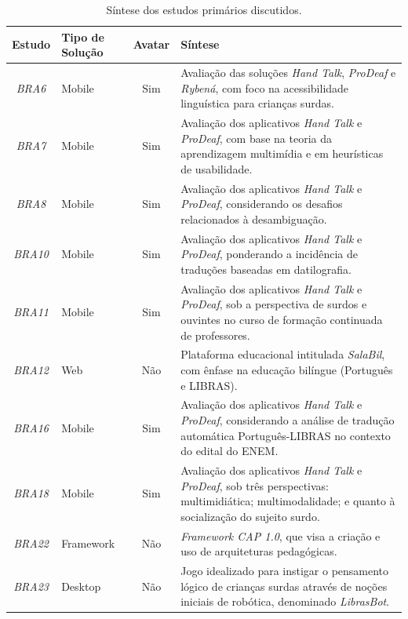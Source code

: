 \begin{small}
\setlength\tabcolsep{0.1cm}
\begin{longtable}{c|>{\centering\arraybackslash}p{2.75cm}|c|p{10cm}}
\caption{Síntese dos estudos primários discutidos.}
\label{ms:table:sintese-estudos}
\endfirsthead
\endhead
\hline
\textbf{Estudo} & \textbf{Tipo de Solução} & \textbf{Avatar} & \textbf{Síntese} \\ \hline
\textit{BRA6} & Mobile & Sim & Avaliação das soluções \textit{Hand Talk}, \textit{ProDeaf} e \textit{Rybená}, com foco na acessibilidade linguística para crianças surdas. \\ \hline
\textit{BRA7} & Mobile & Sim & Avaliação dos aplicativos \textit{Hand Talk} e \textit{ProDeaf}, com base na teoria da aprendizagem multimídia e em heurísticas de usabilidade. \\ \hline
\textit{BRA8} & Mobile & Sim & Avaliação dos aplicativos \textit{Hand Talk} e \textit{ProDeaf}, considerando os desafios relacionados à desambiguação. \\ \hline
\textit{BRA10} & Mobile & Sim & Avaliação dos aplicativos \textit{Hand Talk} e \textit{ProDeaf}, ponderando a incidência de traduções baseadas em datilografia. \\ \hline
\textit{BRA11} & Mobile & Sim & Avaliação dos aplicativos \textit{Hand Talk} e \textit{ProDeaf}, sob a perspectiva de surdos e ouvintes no curso de formação continuada de professores. \\ \hline
\textit{BRA12} & Web & Não & Plataforma educacional intitulada \textit{SalaBil}, com ênfase na educação bilíngue (Português e LIBRAS). \\ \hline
\textit{BRA16} & Mobile & Sim & Avaliação dos aplicativos \textit{Hand Talk} e \textit{ProDeaf}, considerando a análise de tradução automática Português-LIBRAS no contexto do edital do ENEM. \\ \hline
\textit{BRA18} & Mobile & Sim & Avaliação dos aplicativos \textit{Hand Talk} e \textit{ProDeaf}, sob três perspectivas: multimidiática; multimodalidade; e quanto à socialização do sujeito surdo. \\ \hline
\textit{BRA22} & Framework & Não & \textit{Framework CAP 1.0}, que visa a criação e uso de arquiteturas pedagógicas. \\ \hline
\textit{BRA23} & Desktop & Não & Jogo idealizado para instigar o pensamento lógico de crianças surdas através de noções iniciais de robótica, denominado \textit{LibrasBot}. \\ \hline

\end{longtable}
\end{small}
